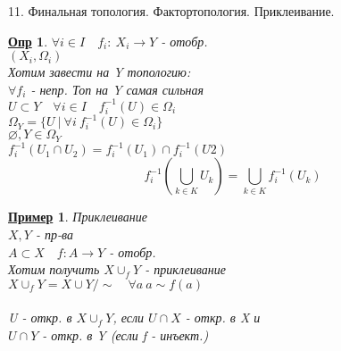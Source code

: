 \documentclass[12pt, fleqn]{article}
\newenvironment{question}[1]{\hspace*{-4em} #1}{\newpage}
\newcommand{\q}{\quad}
\theoremstyle{nonumbermarginbreak}
\newtheorem{definition}{\hspace*{-2em}\underline{\bfseries Опр}}[section]
\newtheorem{example}{\hspace*{-2em}\underline{\bfseries Пример}}[section]
\begin{document}
    \begin{question}{11. Финальная топология. Фактортопология. Приклеивание.}
        \begin{definition} 
            $\forall i \in I \q f_i: \ X_i \rightarrow Y$ - отобр.\\
            $(X_i, \Omega_i)$\\
            Хотим завести на Y топологию:\\
            $\forall f_i$ - непр. Топ на Y самая сильная \\
            $U \subset Y \q \forall i \in I \q f_i^{-1}(U) \in \Omega_i$\\
            $\Omega_Y = \{U \ | \ \forall i \ f_i^{-1}(U) \in \Omega_i\}$\\
            $\varnothing, Y \in \Omega_Y$\\
            $f_i^{-1}(U_1 \cap U_2) = f_i^{-1}(U_1) \cap f_i^{-1}(U2)$\\
            \[f_i^{-1}(\bigcup_{k \in K} U_k) = \bigcup_{k \in K} f_i^{-1}(U_k)\]
        \end{definition}

        \begin{example} 
            Приклеивание\\
            $X, Y$ - пр-ва\\
            $A \subset X \q f: A \rightarrow Y$ - отобр.\\
            Хотим получить $X \cup_f Y$ - приклеивание\\
            $X \cup_f Y = X \cup Y /\sim \q \forall a \ a \sim f(a)$\\
            \\
            U - откр. в $X \cup_f Y$, если $U \cap X$ - откр. в X и\\ $U \cap Y$ - откр. в Y 
            (если f - инъект.)
        \end{example}
    \end{question}
\end{document}
